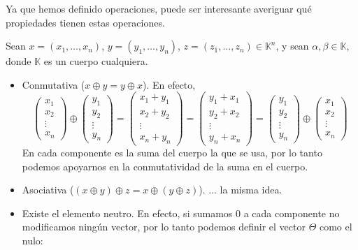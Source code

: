 \documentclass[12pt]{book}
\def\K{\mathbb{K}}
\begin{document}
Ya que hemos definido operaciones, puede ser interesante averiguar qué propiedades tienen estas operaciones.

Sean $x=(x_1,\dots,x_n)$, $y=(y_1,\dots, y_n)$, $z=(z_1,\dots,z_n)\in\K^n$, y sean $\alpha,\beta\in\K$, donde $\K$ es un cuerpo cualquiera.

\begin{itemize}
\item Conmutativa ($x\oplus y=y\oplus x$). En efecto,
  $$ \left(\begin{array}{c}x_1\\ x_2\\ \vdots\\ x_n\end{array}\right)
  \oplus \left(\begin{array}{c}y_1\\y_2\\ \vdots\\ y_n\end{array}\right)
    =\left(\begin{array}{c}x_1+y_1\\x_2+y_2\\ \vdots\\ x_n+y_n\end{array}\right)
      =\left(\begin{array}{c}y_1+x_1\\y_2+x_2\\ \vdots\\ y_n+x_n\end{array}\right)
        =  \left(\begin{array}{c}y_1\\y_2\\ \vdots\\ y_n\end{array}\right)
          \oplus\left(\begin{array}{c}x_1\\ x_2\\ \vdots\\ x_n\end{array}\right)
    $$
En cada componente es la suma del cuerpo la que se usa, por lo tanto podemos apoyarnos en la conmutatividad de la suma en el cuerpo.
\item Asociativa ($(x\oplus y)\oplus z=x\oplus (y\oplus z)$). ... la misma idea.
\item Existe el elemento neutro. En efecto, si sumamos 0 a cada componente no modificamos ningún vector, por lo tanto podemos definir el vector $\Theta$ como el nulo:

\end{itemize}
\end{document}
